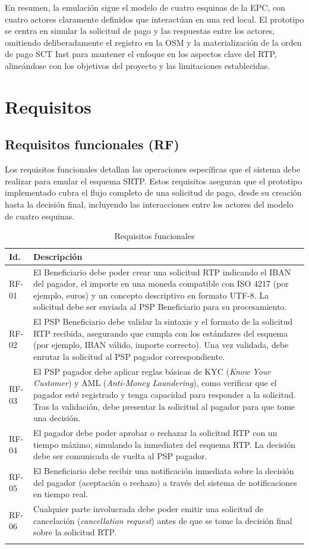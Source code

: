 En resumen, la emulación sigue el modelo de cuatro esquinas de la EPC, con cuatro actores claramente definidos que interactúan en una red local. El prototipo se centra en simular la solicitud de pago y las respuestas entre los actores, omitiendo deliberadamente el registro en la OSM y la materialización de la orden de pago SCT Inst para mantener el enfoque en los aspectos clave del RTP, alineándose con los objetivos del proyecto y las limitaciones establecidas.
\section{Requisitos}
\label{subsec:diseno_requisitos}

\subsection{Requisitos funcionales (RF)}
Los requisitos funcionales detallan las operaciones específicas que el sistema debe realizar para emular el esquema SRTP. Estos requisitos aseguran que el prototipo implementado cubra el flujo completo de una solicitud de pago, desde su creación hasta la decisión final, incluyendo las interacciones entre los actores del modelo de cuatro esquinas.

\begin{longtable}{@{}>{\raggedright\arraybackslash}p{}p{}@{}}
\toprule
\textbf{Id.} & \textbf{Descripción} \\
\midrule\endhead
RF-01 & El Beneficiario debe poder crear una solicitud RTP indicando el IBAN del pagador, el importe en una moneda compatible con ISO 4217 (por ejemplo, euros) y un concepto descriptivo en formato UTF-8. La solicitud debe ser enviada al PSP Beneficiario para su procesamiento. \\
RF-02 & El PSP Beneficiario debe validar la sintaxis y el formato de la solicitud RTP recibida, asegurando que cumpla con los estándares del esquema (por ejemplo, IBAN válido, importe correcto). Una vez validada, debe enrutar la solicitud al PSP pagador correspondiente. \\
RF-03 & El PSP pagador debe aplicar reglas básicas de \textsc{KYC} (\emph{Know Your Customer}) y \textsc{AML} (\emph{Anti-Money Laundering}), como verificar que el pagador esté registrado y tenga capacidad para responder a la solicitud. Tras la validación, debe presentar la solicitud al pagador para que tome una decisión. \\
RF-04 & El pagador debe poder aprobar o rechazar la solicitud RTP con un tiempo máximo, simulando la inmediatez del esquema RTP. La decisión debe ser comunicada de vuelta al PSP pagador. \\
RF-05 & El Beneficiario debe recibir una notificación inmediata sobre la decisión del pagador (aceptación o rechazo) a través del sistema de notificaciones en tiempo real. \\
RF-06 & Cualquier parte involucrada debe poder emitir una solicitud de cancelación (\emph{cancellation request}) antes de que se tome la decisión final sobre la solicitud RTP. \\
\bottomrule
\caption{Requisitos funcionales}
\label{tab:RF}
\end{longtable}


